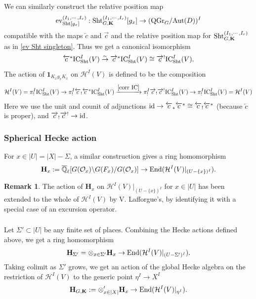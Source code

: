 \documentclass[11pt]{amsart}
\numberwithin{equation}{section}
\theoremstyle{plain}
\theoremstyle{definition}
\newtheorem{remark}[subsubsection]{Remark}
\def\QQ{\mathbb{Q}}
\newcommand\cH{\mathcal{H}}
\newcommand\cO{\mathcal{O}}
\def\bH{\mathbf{H}}
\def\bK{\mathbf{K}}
\newcommand\ev{\textup{ev}}
\newcommand\IC{\textup{IC}}
\newcommand\id{\textup{id}}
\newcommand\Sht{\textup{Sht}}
\newcommand\Aut{\textup{Aut}}
\newcommand\End{\textup{End}}
\newcommand{\isom}{\stackrel{\sim}{\to}}
\newcommand{\Qlbar}{\overline{\QQ}_\ell}
\newcommand{\bs}{\backslash}
\newcommand\sss{\subsubsection}
\newcommand\xr{\xrightarrow}
\newcommand\ot{\otimes}
\newcommand\one{\mathbf{1}}
\newcommand{\oll}[1]{\overleftarrow{#1}}
\newcommand{\orr}[1]{\overrightarrow{#1}}
\newcommand{\Sig}{\Sigma}
\newcommand{\y}{\eta}
\newcommand{\QGr}{\mathrm{QGr}}
\begin{document}
We can similarly construct the relative position map 
\begin{equation*}
\ev_{\Sht[g_{x}]}^{(I_{1},\cdots, I_{r})}: \Sht^{(I_{1},\cdots, I_{r})}_{G,\bK}[g_{x}]\to (\QGr_{G}/\Aut(D))^{I}
\end{equation*}
compatible with the maps $\oll{c}$ and $\orr{c}$ and the relative position map for $\Sht^{(I_{1},\cdots, I_{r})}_{G,\bK}$ as in \eqref{ev Sht singleton}. Thus we get a canonical isomorphism
\begin{equation}\label{corr IC}
\oll{c}^{*}\IC_{\Sht}^{I}(V)\isom \orr{c}^{*}\IC_{\Sht}^{I}(V)\cong\orr{c}^{!}\IC_{\Sht}^{I}(V).
\end{equation}
The action of $\one_{K_{x}g_{x}K_{x}}$ on $\cH^{I}(V)$ is defined to be the composition 
\begin{equation*}
\cH^{I}(V)=\pi^{I}_{!}\IC_{\Sht}^{I}(V)\to \pi^{I}_{!}\oll{c}_{!}\oll{c}^{*}\IC_{\Sht}^{I}(V)\xr{\eqref{corr IC}} \pi^{I}_{!}\orr{c}_{!}\orr{c}^{!}\IC_{\Sht}^{I}(V)\to \pi^{I}_{!}\IC_{\Sht}^{I}(V)=\cH^{I}(V)
\end{equation*}
Here we use the unit and counit of adjunctions $\id \to \oll{c}_{*}\oll{c}^{*}\cong \oll{c}_{!}\oll{c}^{*}$ (because $\oll{c}$ is proper), and $\orr{c}_{!}\orr{c}^{!}\to\id$.


\sss{Spherical Hecke action} For $x\in |U|=|X|-\Sig$, a similar construction gives a ring homomorphism
\begin{equation*}
\bH_{x}:=\Qlbar[G(\cO_{x})\bs G(F_{x})/G(\cO_{x})]\to \End(\cH^{I}(V)|_{(U-\{x\})^{I}}).
\end{equation*}

\begin{remark} The action of $\bH_{x}$ on $\cH^{I}(V)|_{(U-\{x\})^{I}}$ for $x\in |U|$ has been extended to the whole of $\cH^{I}(V)$ by V. Lafforgue's, by identifying it with a special case of an excursion operator.
\end{remark}

\sss{} Let $\Sig'\subset |U|$ be any finite set of places. Combining the Hecke actions defined above, we get a ring homomorphism
\begin{equation*}
\bH_{\Sig'}=\ot_{x\in \Sig'}\bH_{x}\to \End(\cH^{I}(V)|_{(U-\Sig')^{I}}).
\end{equation*}
Taking colimit as $\Sig'$ grows, we get an action of the global Hecke algebra on the restriction of $\cH^{I}(V)$ to the generic point $\y^{I}\to X^{I}$
\begin{equation*}
\bH_{G,\bK}:=\ot'_{x\in |X|}\bH_{x}\to \End(\cH^{I}(V)|_{\y^{I}}).
\end{equation*}
\end{document}
